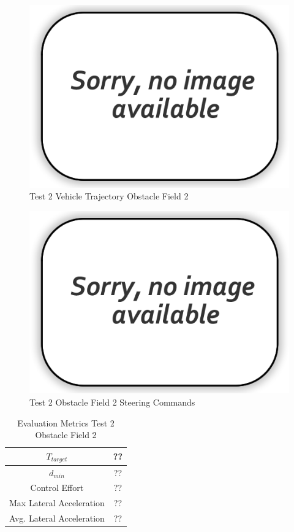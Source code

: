 \documentclass[12pt,twocolumn]{article}
\begin{document}
\begin{figure}
	\centering
	\includegraphics[width=\columnwidth]{Figs/no-image.png}
	\caption{\small Test 2 Vehicle Trajectory Obstacle Field 2}  
	\label{fig:Test2_Obst2}
\end{figure}

\begin{figure}
	\centering
	\includegraphics[width=\columnwidth]{Figs/no-image.png}
	\caption{\small Test 2 Obstacle Field 2 Steering Commands}  
	\label{fig:Test2_Obst2_Steer}
\end{figure}

\begin{table}
\begin{center}
	\begin{tabular}{||c |c||} 
		\hline
		$T_{target}$ & ??\\ 
		\hline
		$d_{min}$ & ??\\
		\hline
		Control Effort & ??\\
		\hline
		Max Lateral Acceleration & ??\\
		\hline
		Avg. Lateral Acceleration & ??\\
		\hline
	\end{tabular}
\end{center}
\caption{Evaluation Metrics Test 2 Obstacle Field 2}
\label{t:EvalTest2Obst2}
\end{table}
\end{document}

